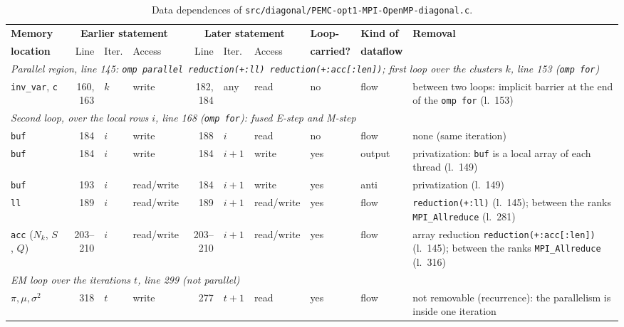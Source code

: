 \documentclass[conference,onecolumn]{IEEEtran}
\begin{document}
\begin{table}[H]
\centering
\caption{Data dependences of \texttt{src/diagonal/PEMC-opt1-MPI-OpenMP-diagonal.c}.}\label{tab:dep-opt1-diag}
\scriptsize
\setlength{\tabcolsep}{3pt}
\begin{tabular}{lrllrllllp{}}
\toprule
\textbf{Memory} & \multicolumn{3}{c}{\textbf{Earlier statement}} & \multicolumn{3}{c}{\textbf{Later statement}} & \textbf{Loop-} & \textbf{Kind of} & \textbf{Removal} \\
\cmidrule(lr){2-4} \cmidrule(lr){5-7}
\textbf{location} & Line & Iter. & Access & Line & Iter. & Access & \textbf{carried?} & \textbf{dataflow} & \\
\midrule
\multicolumn{10}{p{0.92\textwidth}}{\emph{Parallel region, line 145: \texttt{omp parallel reduction(+:ll) reduction(+:acc[:len])}; first loop over the clusters $k$, line 153 (\texttt{omp for})}} \\
\texttt{inv\_var}, \texttt{c} & 160, 163 & $k$ & write & 182, 184 & any & read & no & flow & between two loops: implicit barrier at the end of the \texttt{omp for} (l.~153) \\
\midrule
\multicolumn{10}{p{0.92\textwidth}}{\emph{Second loop, over the local rows $i$, line 168 (\texttt{omp for}): fused E-step and M-step}} \\
\texttt{buf} & 184 & $i$ & write & 188 & $i$ & read & no & flow & none (same iteration) \\
\texttt{buf} & 184 & $i$ & write & 184 & $i+1$ & write & yes & output & privatization: \texttt{buf} is a local array of each thread (l.~149) \\
\texttt{buf} & 193 & $i$ & read/write & 184 & $i+1$ & write & yes & anti & privatization (l.~149) \\
\texttt{ll} & 189 & $i$ & read/write & 189 & $i+1$ & read/write & yes & flow & \texttt{reduction(+:ll)} (l.~145); between the ranks \texttt{MPI\_Allreduce} (l.~281) \\
\texttt{acc} ($N_k$, $S$, $Q$) & 203--210 & $i$ & read/write & 203--210 & $i+1$ & read/write & yes & flow & array reduction \texttt{reduction(+:acc[:len])} (l.~145); between the ranks \texttt{MPI\_Allreduce} (l.~316) \\
\midrule
\multicolumn{10}{p{0.92\textwidth}}{\emph{EM loop over the iterations $t$, line 299 (not parallel)}} \\
$\pi,\mu,\sigma^2$ & 318 & $t$ & write & 277 & $t+1$ & read & yes & flow & not removable (recurrence): the parallelism is inside one iteration \\
\bottomrule
\end{tabular}
\end{table}
\end{document}
